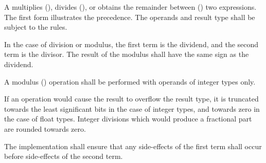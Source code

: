 
\begin{grammar}
 \\
	 \\
	 \terminal{*}  \\
	 \terminal{/}  \\
	 \terminal{\%}  \\
\end{grammar}

\specsubsubitem
A  multiplies (\terminal{*}), divides
(\terminal{/}), or obtains the remainder between (\terminal{\%}) two
expressions. The first form illustrates the precedence. The operands and result
type shall be subject to the  rules.

\specsubsubitem
In the case of division or modulus, the first term is the dividend, and the
second term is the divisor. The result of the modulus shall have the same sign
as the dividend.

\specsubsubitem
A modulus (\terminal{\%}) operation shall be performed with operands of integer
types only.

\specsubsubitem
If an operation would cause the result to overflow the result type, it is
truncated towards the least significant bits in the case of integer types, and
towards zero in the case of float types. Integer divisions which would produce
a fractional part are rounded towards zero.

\specsubsubitem
The implementation shall ensure that any side-effects of the first term shall
occur before side-effects of the second term.


\begin{grammar}
 \\
	 \\
	 \terminal{+}  \\
	 \terminal{-}  \\
\end{grammar}

